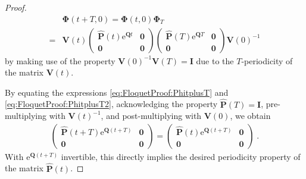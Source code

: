 \documentclass[a4paper, nonatbib, 3p, twocolumn]{elsarticle}
\theoremstyle{plain}
\theoremstyle{definition}
\theoremstyle{remark}
\newcommand{\mo}{\vPh_T}
\newcommand{\ex}{\re} %
\newcommand{\vzero}{\mathbf{0}}
\newcommand{\re}{\mathrm e}
\newcommand{\vPh}{\mathbf \Phi}
\newcommand{\vI}{\mathbf I}
\newcommand{\vP}{\mathbf P}
\newcommand{\vQ}{\mathbf Q}
\newcommand{\vV}{\mathbf V}
\begin{document}
\begin{proof}
    \begin{align}\label{eq:FloquetProof:PhitplusT2}
        &\vPh(t + T, 0) =  \vPh(t, 0) \mo \nonumber\\
        =& \vV(t) \begin{pmatrix}
            \hat{\vP}(t) \ex^{\vQ t} & \vzero\\ \vzero & \vzero
        \end{pmatrix} \begin{pmatrix}
            \hat{\vP}(T)\ex^{\vQ T} & \vzero\\ \vzero & \vzero
        \end{pmatrix} \vV(0)^{-1}
    \end{align}
    by making use of the property $\vV(0)^{-1}\vV(T) =\vI$ due to the $T$-periodicity of the matrix $\vV(t)$.
    
    By equating the expressions \eqref{eq:FloquetProof:PhitplusT} and \eqref{eq:FloquetProof:PhitplusT2}, acknowledging the property $\hat{\vP}(T)=\vI$, pre-multiplying with $\vV(t)^{-1}$, and post-multiplying with $\vV(0)$, we obtain
\begin{align}
        \begin{pmatrix}
            \hat{\vP}(t + T) \ex^{\vQ (t+T)} & \vzero\\ \vzero & \vzero
        \end{pmatrix} = \begin{pmatrix}
            \hat{\vP}(t) \ex^{\vQ (t+T)} & \vzero\\ \vzero & \vzero
        \end{pmatrix} \;.
    \end{align}
    With $\ex^{\vQ (t+T)}$ invertible, this directly implies the desired periodicity property of the matrix $\hat{\vP}(t)$.
\end{proof}
\end{document}
